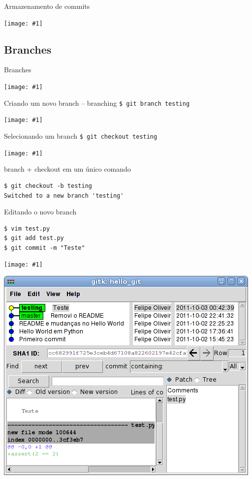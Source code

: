 \documentclass[portuguese,brazil]{beamer}
\newcommand\img[1]{
  \begin{center}
    \texttt{[image: \#1]}
  \end{center}
}
\begin{document}
\begin{frame}{Armazenamento de commits}
  \img{images/commitstore.png}
\end{frame}

\subsection{Branches}

\begin{frame}{Branches}
  \img{images/masterbranch.png}
\end{frame}

\begin{frame}{Criando um novo branch -- branching}
  \texttt{\$ git branch testing}
  \img{images/testingbranch.png}
\end{frame}

\begin{frame}{Selecionando um branch}
  \texttt{\$ git checkout testing}
  \img{images/testingheadbranch.png}
\end{frame}

\begin{frame}[fragile]{branch + checkout em um único comando}
\begin{verbatim}
$ git checkout -b testing
Switched to a new branch 'testing'
\end{verbatim}
\end{frame}

\begin{frame}[fragile]{Editando o novo branch}
\begin{verbatim}
$ vim test.py
$ git add test.py
$ git commit -m "Teste"
\end{verbatim}
\img{images/testingdiverged.png}
\end{frame}

\begin{frame}
\begin{center}
  \includegraphics[scale=0.45]{images/gitkhellogittestingbranch.png}
\end{center}
\end{frame}
\end{document}

